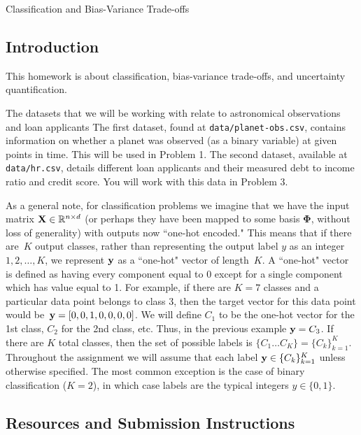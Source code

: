 \documentclass[submit]{../harvardml}
\begin{document}
\begin{center}
  {\Large Classification and Bias-Variance Trade-offs}\\
\end{center}

\subsection*{Introduction}

This homework is about classification, bias-variance trade-offs, and
uncertainty quantification.

The datasets that we will be working with relate to astronomical observations and loan applicants
The first dataset, found at \verb|data/planet-obs.csv|,
contains information on whether a planet was observed (as a binary
variable) at given points in time. This will be used in Problem 1. The
second dataset, available at \verb|data/hr.csv|, details different
loan applicants and their measured debt to income ratio and credit score. You will
work with this data in Problem 3.

As a general note, for classification problems we imagine that we have
the input matrix $\mathbf{X} \in \mathbb{R}^{n \times d}$ (or perhaps they
have been mapped to some basis $\bm{\Phi}$, without loss of
generality) with outputs now ``one-hot encoded."  This means that if
there are~$K$ output classes, rather than representing the output
label $y$ as an integer~${1,2,\ldots,K}$, we represent $\mathbf{y}$ as a
``one-hot" vector of length~$K$. A ``one-hot" vector is defined as
having every component equal to 0 except for a single component which
has value equal to 1.  For example, if there are $K = 7$ classes and a
particular data point belongs to class 3, then the target vector for
this data point would be~$\mathbf{y} = [0,0,1,0,0,0,0]$.  We will define
$C_1$ to be the one-hot vector for the 1st class, $C_2$ for the 2nd
class, etc.  Thus, in the previous example $\mathbf{y} = C_3$. If there
are $K$ total classes, then the set of possible labels is $\{C_1
  \ldots C_K \} = \{C_k\}_{k=1}^K$.  Throughout the assignment we will
assume that each label $\mathbf{y} \in \{C_k\}_{k=1}^K$ unless otherwise
specified. The most common exception is the case of binary
classification ($K = 2$), in which case labels are the typical
integers $y \in \{0, 1\}$.

\subsection*{Resources and Submission Instructions}
\end{document}
